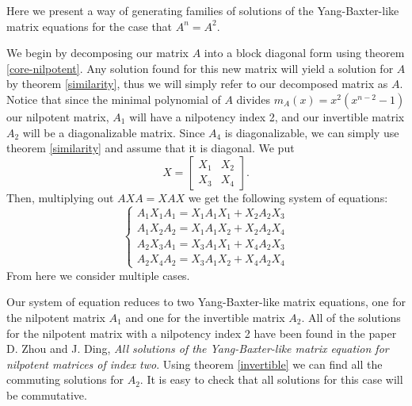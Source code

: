 \documentclass{article}
\begin{document}
\begin{algorithm}
  Here we present a way of generating families of solutions of the Yang-Baxter-like matrix equations for the case that $A^n = A^2$.

  We begin by decomposing our matrix $A$ into a block diagonal form using theorem \ref{core-nilpotent}.
  Any solution found for this new matrix will yield a solution for $A$ by theorem \ref{similarity}, thus we will simply refer to our decomposed matrix as $A$.
  Notice that since the minimal polynomial of $A$ divides $m_A(x) = x^2 (x^{n - 2} - 1)$ our nilpotent matrix, $A_1$ will have a nilpotency index 2, and our invertible matrix $A_2$ will be a diagonalizable matrix.
  Since $A_4$ is diagonalizable, we can simply use theorem \ref{similarity} and assume that it is diagonal.
  We put
  \[X = \begin{bmatrix} X_1 & X_2\\ X_3 & X_4 \end{bmatrix}.\]
  Then, multiplying out $A X A = X A X$ we get the following system of equations:
  \[\begin{cases}
    A_1 X_1 A_1 = X_1 A_1 X_1 + X_2 A_2 X_3\\
    A_1 X_2 A_2 = X_1 A_1 X_2 + X_2 A_2 X_4\\
    A_2 X_3 A_1 = X_3 A_1 X_1 + X_4 A_2 X_3\\
    A_2 X_4 A_2 = X_3 A_1 X_2 + X_4 A_2 X_4
  \end{cases}\]
  From here we consider multiple cases.

  \begin{case}[$X_2 = X_3 = 0$]
    Our system of equation reduces to two Yang-Baxter-like matrix equations, one for the nilpotent matrix $A_1$ and one for the invertible matrix $A_2$.
    All of the solutions for the nilpotent matrix with a nilpotency index 2 have been found in the paper D. Zhou and J. Ding, \textit{All solutions of the Yang-Baxter-like matrix equation for nilpotent matrices of index two}.
    Using theorem \ref{invertible} we can find all the commuting solutions for $A_2$.
    It is easy to check that all solutions for this case will be commutative.
  \end{case}


\end{algorithm}
\end{document}
